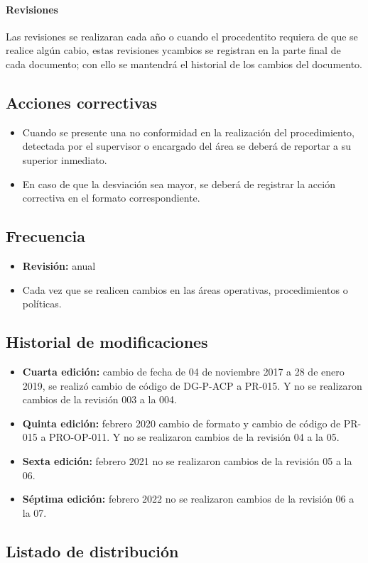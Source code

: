 \paragraph{Revisiones}

Las revisiones se realizaran cada año o cuando el procedentito requiera de que se realice algún cabio, estas revisiones ycambios se registran en la parte final de cada documento; con ello se mantendrá el historial de los cambios del documento.

\subsection{Acciones correctivas}

\begin{itemize}
	\item Cuando se presente una no conformidad en la realización del procedimiento, detectada por el supervisor o encargado del área se deberá de reportar a su superior inmediato.
	\item En caso de que la desviación sea mayor, se deberá de registrar la acción correctiva en el formato correspondiente.
\end{itemize}

\subsection{Frecuencia}

\begin{itemize}
	\item \textbf{Revisión:} anual
	\item Cada vez que se realicen cambios en las áreas operativas, procedimientos o políticas.
\end{itemize}

\subsection{Historial de modificaciones}

\begin{itemize}
	\item \textbf{Cuarta edición:} cambio de fecha de 04 de noviembre 2017 a 28 de enero 2019, se realizó cambio de código de DG-P-ACP a PR-015. Y no se realizaron cambios de la revisión 003 a la 004.
	\item \textbf{Quinta edición:} febrero 2020 cambio de formato y cambio de código de PR-015 a PRO-OP-011. Y no se realizaron cambios de la revisión 04 a la 05.
	\item \textbf{Sexta edición:} febrero 2021 no se realizaron cambios de la revisión 05 a la 06.
	\item \textbf{Séptima edición:} febrero 2022 no se realizaron cambios de la revisión 06 a la 07.
\end{itemize}

\subsection{Listado de distribución}

